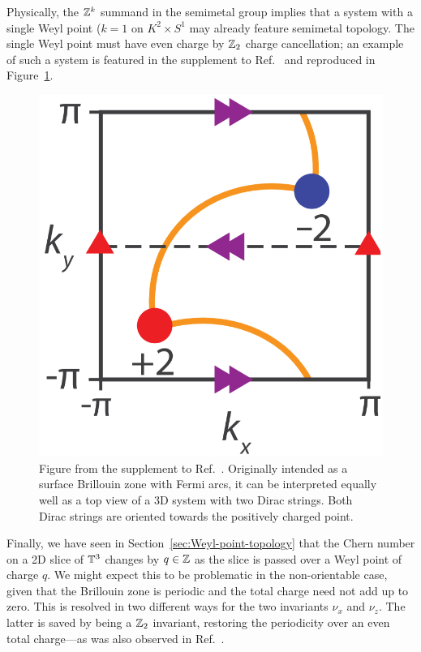 Physically, the $\mathbb{Z}^k$ summand in the semimetal group implies that a system with a single Weyl point ($k=1$ on $K^2\times S^1$ may already feature semimetal topology. The single Weyl point must have even charge by $\mathbb{Z}_2$ charge cancellation; an example of such a system is featured in the supplement to Ref.~\cite{Fonseca-Vaidya_nonorientable} and reproduced in Figure~\ref{fig:double-points}.
\begin{figure}[htb!]
	\centering
	\includegraphics[width=.4\linewidth]{Images/double-points}
	\caption{Figure from the supplement to Ref.~\cite{Fonseca-Vaidya_nonorientable}. Originally intended as a surface Brillouin zone with Fermi arcs, it can be interpreted equally well as a top view of a 3D system with two Dirac strings. Both Dirac strings are oriented towards the positively charged point.}
	\label{fig:double-points}
\end{figure}

Finally, we have seen in Section~\ref{sec:Weyl-point-topology} that the Chern number on a 2D slice of $\mathbb{T}^3$ changes by $q\in\mathbb{Z}$ as the slice is passed over a Weyl point of charge $q$. We might expect this to be problematic in the non-orientable case, given that the Brillouin zone is periodic and the total charge need not add up to zero. This is resolved in two different ways for the two invariants $\nu_x$ and $\nu_z$. The latter is saved by being a $\mathbb{Z}_2$ invariant, restoring the periodicity over an even total charge---as was also observed in Ref.\ \cite{Fonseca-Vaidya_nonorientable}.

